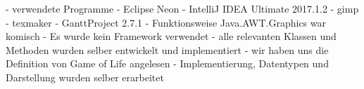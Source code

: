 \documentclass[12pt]{article}
\theoremstyle{plain}
\begin{document}
\begin{linenumbers}
- verwendete Programme
	- Eclipse Neon
	- IntelliJ IDEA Ultimate 2017.1.2
	- gimp
	- texmaker
	- GanttProject 2.7.1
- Funktionsweise Java.AWT.Graphics war komisch
- Es wurde kein Framework verwendet
	- alle relevanten Klassen und Methoden wurden selber entwickelt und implementiert
- wir haben uns die Definition von Game of Life angelesen
	- Implementierung, Datentypen und Darstellung wurden selber erarbeitet


\end{linenumbers}
\end{document}
